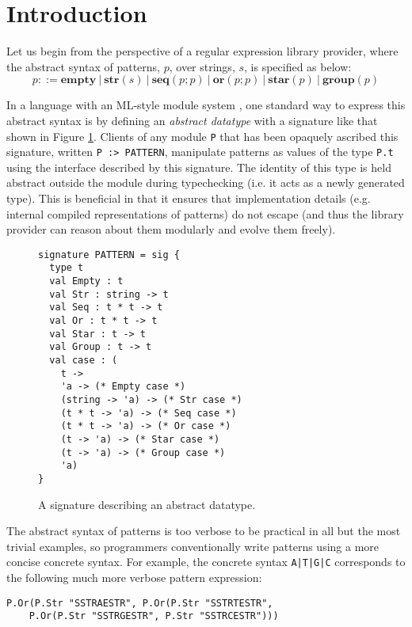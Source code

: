 \documentclass[preprint]{sigplanconf}
\begin{document}
\section{Introduction}\label{intro}
Let us begin from the perspective of a regular expression library provider, where the abstract syntax of {patterns}, $p$, over strings, $s$, is specified as below:\[p ::= \textbf{empty} ~|~ \textbf{str}(s) ~|~ \textbf{seq}(p; p) ~|~ \textbf{or}(p; p) ~|~ \textbf{star}(p) ~|~ \textbf{group}(p)\]

In a language with an ML-style module system \cite{MacQueen:1984:MSM:800055.802036}, one standard way to express this abstract syntax is by defining an \emph{abstract datatype} with a signature like that shown in Figure \ref{fig:PATTERN}. Clients of any module \lstinline{P} that has been opaquely ascribed this signature, written \lstinline{P :> PATTERN}, manipulate patterns as values of the type \verb|P.t| using the interface described by this signature. The identity of this type is held abstract outside the module during typechecking (i.e. it acts as a newly generated type). This is beneficial in that it ensures that implementation details (e.g. internal compiled representations of patterns) do not escape (and thus the library provider can reason about them modularly and evolve them freely).

\begin{figure}
\begin{lstlisting}[deletekeywords={case},numbers=none]
signature PATTERN = sig {
  type t
  val Empty : t
  val Str : string -> t
  val Seq : t * t -> t
  val Or : t * t -> t
  val Star : t -> t
  val Group : t -> t
  val case : (
    t -> 
    'a -> (* Empty case *)
    (string -> 'a) -> (* Str case *)
    (t * t -> 'a) -> (* Seq case *)
    (t * t -> 'a) -> (* Or case *)
    (t -> 'a) -> (* Star case *)
    (t -> 'a) -> (* Group case *)
    'a)
}
\end{lstlisting}
\caption{A signature describing an abstract datatype.}
\label{fig:PATTERN}\vspace{-10px}
\end{figure}

The abstract syntax of patterns is too verbose to be practical  in all but the most trivial examples, so programmers conventionally write patterns using a more concise concrete syntax. For example, the concrete syntax \lstinline{A|T|G|C} corresponds to the following much more verbose pattern expression:
\begin{lstlisting}[numbers=none,mathescape=|]
P.Or(P.Str "SSTRAESTR", P.Or(P.Str "SSTRTESTR", 
	P.Or(P.Str "SSTRGESTR", P.Str "SSTRCESTR")))
\end{lstlisting} 
\end{document}
